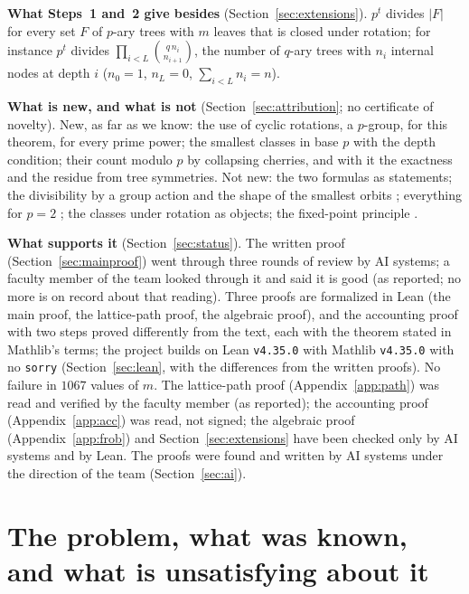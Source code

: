\documentclass[11pt]{article}
\theoremstyle{definition}
\theoremstyle{remark}
\numberwithin{equation}{section}
\numberwithin{figure}{section}
\newcommand{\LeanVersions}{Lean \texttt{v4.35.0} with Mathlib \texttt{v4.35.0}}
\begin{document}
{\small %
\noindent\textbf{What Steps~1 and~2 give besides} (Section~\ref{sec:extensions}). $p^t$ divides $|F|$ for every
set $F$ of $p$-ary trees with $m$ leaves that is closed under rotation; for instance $p^t$ divides
$\prod_{i<L}\binom{q\,n_i}{n_{i+1}}$, the number of $q$-ary trees with $n_i$ internal nodes at depth $i$
($n_0=1$, $n_L=0$, $\sum_{i<L}n_i=n$).

\noindent\textbf{What is new, and what is not} (Section~\ref{sec:attribution}; no certificate of novelty). New,
as far as we know: the use of cyclic rotations, a $p$-group, for this theorem, for every prime power; the
smallest classes in base $p$ with the depth condition; their count modulo $p$ by collapsing cherries, and
with it the exactness and the residue from tree symmetries. Not new: the two formulas as statements; the
divisibility by a group action and the shape of the smallest orbits \cite{Konvalinka}; everything for $p=2$
\cite{Etherington,DeutschSagan,KerstingFischer}; the classes under rotation as objects; the fixed-point
principle \cite{Gessel}.

\noindent\textbf{What supports it} (Section~\ref{sec:status}). The written proof (Section~\ref{sec:mainproof})
went through three rounds of review by AI systems; a faculty member of the team looked through it and said it
is good (as reported; no more is on record about that reading). Three proofs are formalized in Lean (the main
proof, the lattice-path proof, the algebraic proof), and the accounting proof with two steps proved
differently from the text, each with the theorem stated in Mathlib's terms; the project
builds on \LeanVersions{} with no \texttt{sorry} (Section~\ref{sec:lean}, with the differences from the
written proofs). No failure in $1067$ values of $m$. The lattice-path proof (Appendix~\ref{app:path})
was read and verified by the faculty member (as reported); the accounting proof (Appendix~\ref{app:acc}) was
read, not signed; the algebraic proof (Appendix~\ref{app:frob}) and Section~\ref{sec:extensions} have been
checked only by AI systems and by Lean. The proofs were found and written by AI systems under the direction
of the team (Section~\ref{sec:ai}).\par}

\clearpage
\setcounter{tocdepth}{1}
\tableofcontents

\section{The problem, what was known, and what is unsatisfying about it}\label{sec:problem}
\end{document}
